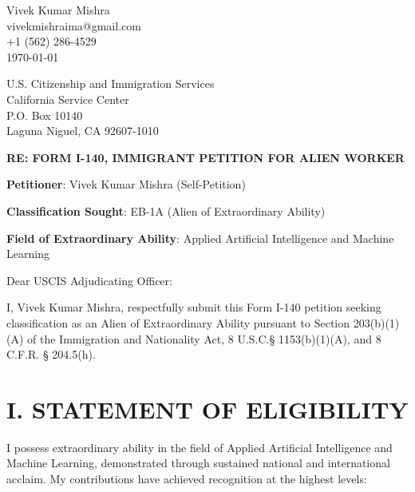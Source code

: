 \documentclass[11pt]{article}
\begin{document}
\begin{flushright}
Vivek Kumar Mishra\\
vivekmishraima@gmail.com\\
+1 (562) 286-4529\\
\vspace{0.5em}
\today
\end{flushright}

\vspace{1em}

\noindent
U.S. Citizenship and Immigration Services\\
California Service Center\\
P.O. Box 10140\\
Laguna Niguel, CA 92607-1010

\vspace{1em}

\textbf{RE: FORM I-140, IMMIGRANT PETITION FOR ALIEN WORKER}

\textbf{Petitioner}: Vivek Kumar Mishra (Self-Petition)

\textbf{Classification Sought}: EB-1A (Alien of Extraordinary Ability)

\textbf{Field of Extraordinary Ability}: Applied Artificial Intelligence and Machine Learning

\vspace{1em}

Dear USCIS Adjudicating Officer:

\vspace{0.5em}

I, Vivek Kumar Mishra, respectfully submit this Form I-140 petition seeking classification as an Alien of Extraordinary Ability pursuant to Section 203(b)(1)(A) of the Immigration and Nationality Act, 8 U.S.C.§ 1153(b)(1)(A), and 8 C.F.R. § 204.5(h).

\section*{I. STATEMENT OF ELIGIBILITY}

I possess extraordinary ability in the field of Applied Artificial Intelligence and Machine Learning, demonstrated through sustained national and international acclaim. My contributions have achieved recognition at the highest levels:
\end{document}
